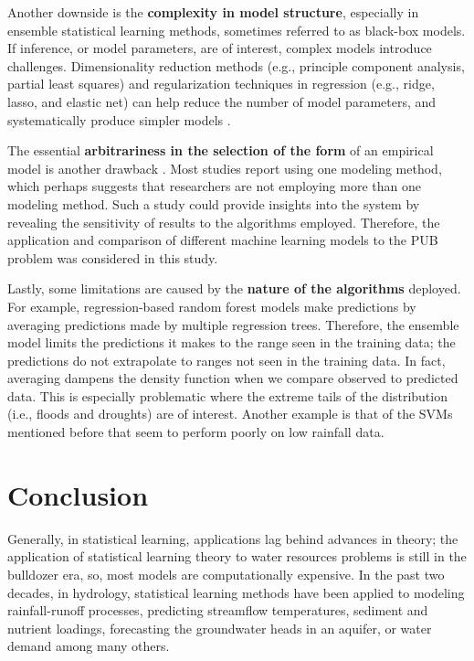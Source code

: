 Another downside is the \textbf{complexity in model structure}, especially in ensemble statistical learning methods, sometimes referred to as black-box models. If inference, or model parameters, are of interest, complex models introduce challenges. Dimensionality reduction methods (e.g., principle component analysis, partial least squares) and regularization techniques in regression (e.g., ridge, lasso, and elastic net) can help reduce the number of model parameters, and systematically produce simpler models \cite{friedman2001elements}. 

The essential \textbf{arbitrariness in the selection of the form} of an empirical model is another drawback \cite{klemes1982empirical}. Most studies report using one modeling method, which perhaps suggests that researchers are not employing more than one modeling method. Such a study could provide insights into the system by revealing the sensitivity of results to the algorithms employed. Therefore, the application and comparison of different machine learning models to the PUB problem was considered in this study. 

Lastly, some limitations are caused by the \textbf{nature of the algorithms} deployed. For example, regression-based random forest models make predictions by averaging predictions made by multiple regression trees. Therefore, the ensemble model limits the predictions it makes to the range seen in the training data; the predictions do not extrapolate to ranges not seen in the training data. In fact, averaging dampens the density function when we compare  observed to predicted data. This is especially problematic where the extreme tails of the distribution (i.e., floods and droughts) are of interest. Another example is that of the SVMs mentioned before that seem to perform poorly on low rainfall data. 


\section{Conclusion} 
Generally, in statistical learning, applications lag behind advances in theory; the application of statistical learning theory to water resources problems is still in the bulldozer era, so, most models are computationally expensive. In the past two decades, in hydrology, statistical learning methods have been applied to modeling rainfall-runoff processes, predicting streamflow temperatures, sediment and nutrient loadings, forecasting the groundwater heads in an aquifer, or water demand among many others.

